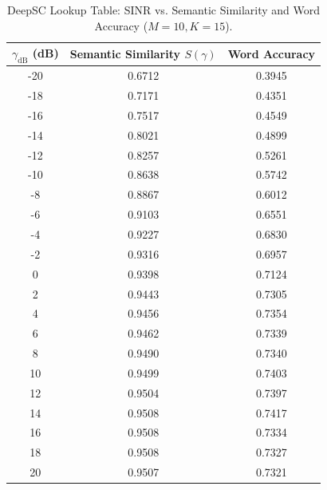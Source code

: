 \documentclass[journal,onecolumn]{IEEEtran}
\begin{document}
\begin{table}[H]
    \centering
    \caption{DeepSC Lookup Table: SINR vs. Semantic Similarity and Word Accuracy ($M=10, K=15$).}
    \label{tab:deepsc_lookup}
    \begin{tabular}{ccc}
        \toprule
        $\gamma_{\text{dB}}$ (dB) & Semantic Similarity $S(\gamma)$ & Word Accuracy \\
        \midrule
        -20 & 0.6712 & 0.3945 \\
        -18 & 0.7171 & 0.4351 \\
        -16 & 0.7517 & 0.4549 \\
        -14 & 0.8021 & 0.4899 \\
        -12 & 0.8257 & 0.5261 \\
        -10 & 0.8638 & 0.5742 \\
        -8  & 0.8867 & 0.6012 \\
        -6  & 0.9103 & 0.6551 \\
        -4  & 0.9227 & 0.6830 \\
        -2  & 0.9316 & 0.6957 \\
        0   & 0.9398 & 0.7124 \\
        2   & 0.9443 & 0.7305 \\
        4   & 0.9456 & 0.7354 \\
        6   & 0.9462 & 0.7339 \\
        8   & 0.9490 & 0.7340 \\
        10  & 0.9499 & 0.7403 \\
        12  & 0.9504 & 0.7397 \\
        14  & 0.9508 & 0.7417 \\
        16  & 0.9508 & 0.7334 \\
        18  & 0.9508 & 0.7327 \\
        20  & 0.9507 & 0.7321 \\
        \bottomrule
    \end{tabular}
\end{table}
\end{document}
